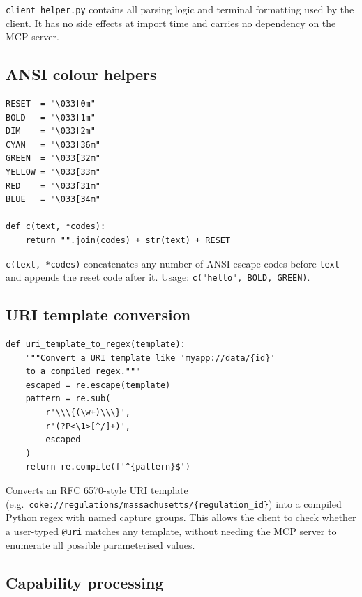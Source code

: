 \documentclass[11pt, a4paper]{article}
\begin{document}
\texttt{client\_helper.py} contains all parsing logic and terminal formatting used by the client. It has no side effects at import time and carries no dependency on the MCP server.

\subsection{ANSI colour helpers}

\begin{lstlisting}[caption={Colour constants and the c() helper}]
RESET  = "\033[0m"
BOLD   = "\033[1m"
DIM    = "\033[2m"
CYAN   = "\033[36m"
GREEN  = "\033[32m"
YELLOW = "\033[33m"
RED    = "\033[31m"
BLUE   = "\033[34m"

def c(text, *codes):
    return "".join(codes) + str(text) + RESET
\end{lstlisting}

\texttt{c(text, *codes)} concatenates any number of ANSI escape codes before \texttt{text} and appends the reset code after it. Usage: \lstinline{c("hello", BOLD, GREEN)}.

\subsection{URI template conversion}

\begin{lstlisting}[caption={uri\_template\_to\_regex}]
def uri_template_to_regex(template):
    """Convert a URI template like 'myapp://data/{id}'
    to a compiled regex."""
    escaped = re.escape(template)
    pattern = re.sub(
        r'\\\{(\w+)\\\}',
        r'(?P<\1>[^/]+)',
        escaped
    )
    return re.compile(f'^{pattern}$')
\end{lstlisting}

Converts an RFC 6570-style URI template (e.g.\ \texttt{coke://regulations/massachusetts/\{regulation\_id\}}) into a compiled Python regex with named capture groups. This allows the client to check whether a user-typed \texttt{@uri} matches any template, without needing the MCP server to enumerate all possible parameterised values.

\subsection{Capability processing}
\end{document}
